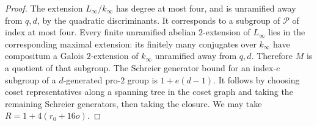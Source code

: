 \documentclass[a4paper,11pt]{article}
\theoremstyle{definition}
\theoremstyle{remark}
\numberwithin{equation}{section}
\begin{document}
\begin{proof}
The extension \(L_\infty/k_\infty\) has degree at most four, and is unramified away from \(q,d\), by the quadratic discriminants. It corresponds to a subgroup of \(\mathcal P\) of index at most four. Every finite unramified abelian \(2\)-extension of \(L_\infty\) lies in the corresponding maximal extension: its finitely many conjugates over \(k_\infty\) have compositum a Galois \(2\)-extension of \(k_\infty\) unramified away from \(q,d\). Therefore \(M\) is a quotient of that subgroup. The Schreier generator bound for an index-\(e\) subgroup of a \(d\)-generated pro-\(2\) group is \(1+e(d-1)\). It follows by choosing coset representatives along a spanning tree in the coset graph and taking the remaining Schreier generators, then taking the closure. We may take \(R=1+4(r_0+16o)\).
\end{proof}
\end{document}
